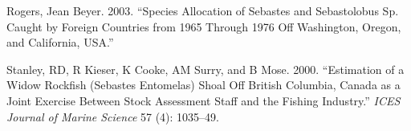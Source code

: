 \documentclass[
]{scrartcl}
\newlength{\cslhangindent}
\newenvironment{CSLReferences}[2] %
 {\begin{list}{}{%
  \setlength{\itemindent}{0pt}
  \setlength{\leftmargin}{0pt}
  \setlength{\parsep}{0pt}
  \ifodd #1
   \setlength{\leftmargin}{\cslhangindent}
   \setlength{\itemindent}{-1\cslhangindent}
  \fi
  \setlength{\itemsep}{#2\baselineskip}}}
 {\end{list}}
\begin{document}
\begin{CSLReferences}{1}{0}
Rogers, Jean Beyer. 2003. {``Species Allocation of {Sebastes} and
{Sebastolobus} Sp. Caught by Foreign Countries from 1965 Through 1976
Off {Washington}, {Oregon}, and {California}, {USA}.''}

Stanley, RD, R Kieser, K Cooke, AM Surry, and B Mose. 2000.
{``Estimation of a Widow Rockfish ({Sebastes} Entomelas) Shoal Off
{British} {Columbia}, {Canada} as a Joint Exercise Between Stock
Assessment Staff and the Fishing Industry.''} \emph{ICES Journal of
Marine Science} 57 (4): 1035--49.

\end{CSLReferences}
\end{document}
